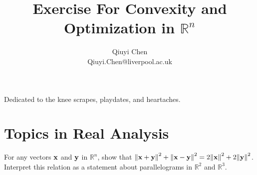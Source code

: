 \documentclass[10pt]{extarticle}
\title{\huge\bfseries Exercise For Convexity and Optimization in $\mathbb{R}^n$}
\author{\Large Qiuyi Chen\\
Qiuyi.Chen@liverpool.ac.uk}
\date{\calligra{May, 2025}}
\begin{document}
\setlength{\abovedisplayskip}{3pt}
\setlength{\belowdisplayskip}{3pt}
\setlength{\abovedisplayshortskip}{0pt}
\setlength{\belowdisplayshortskip}{0pt}
\maketitle

\begin{tcolorbox}[title=Contents, fonttitle=\huge\sffamily\bfseries\selectfont,interior style={left color=contcol1!40!white,right color=contcol2!40!white},frame style={left color=contcol1!80!white,right color=contcol2!80!white},coltitle=black,top=2mm,bottom=2mm,left=2mm,right=2mm,drop fuzzy shadow,enhanced,breakable]
    \makeatletter
    \makeatother
\end{tcolorbox}

\vspace*{10mm}

\clearpage
\vspace*{\fill}
\begin{center}
    Dedicated to the knee scrapes, playdates, and heartaches.
\end{center}

\vspace*{\fill}
\clearpage
\section{Topics in Real Analysis}

\begin{exercise}[1.1]
    For any vectors $\bf{x}$ and $\bf{y}$ in $\mathbb{R}^n$, show that ${\Vert \bf{x} + \bf{y} \Vert}^2 +{\Vert \bf{x} - \bf{y} \Vert}^2 = 2{\Vert \bf{x} \Vert}^2 + 2{\Vert \bf{y} \Vert}^2$. Interpret this relation as a statement about parallelograms in $\mathbb{R}^2$ and $\mathbb{R}^3$.
\end{exercise}
\end{document}
